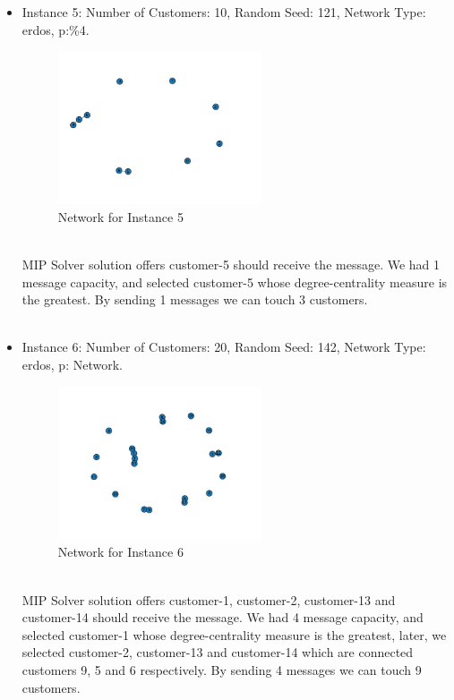 \documentclass[11pt]{article}
\begin{document}
\begin{itemize}
\\
\item Instance 5: Number of Customers: 10, Random Seed: 121, Network Type: erdos, p:\%4.
\\
\begin{figure}[htp]
    \centering
    \includegraphics[width=6cm]{micro_world_case_5}
    \caption{Network for Instance 5}
    \label{fig:fig_micro_world_case_5}
\end{figure}
\\
MIP Solver solution offers customer-5 should receive the message.
We had 1 message capacity, and selected customer-5 whose degree-centrality measure is the greatest. By sending 1 messages we can touch 3 customers.
\\
\\

\item Instance 6: Number of Customers: 20, Random Seed: 142, Network Type: erdos, p: %
Network.
\\
\begin{figure}[htp]
    \centering
    \includegraphics[width=6cm]{micro_world_case_6}
    \caption{Network for Instance 6}
    \label{fig:fig_micro_world_case_6}
\end{figure}
\\
MIP Solver solution offers customer-1, customer-2, customer-13 and customer-14 should receive the message.
We had 4 message capacity, and selected customer-1 whose degree-centrality measure is the greatest, later, we selected customer-2, customer-13 and customer-14 which are connected customers 9, 5 and 6 respectively. By sending 4 messages we can touch 9 customers.
\end{itemize}
\end{document}

